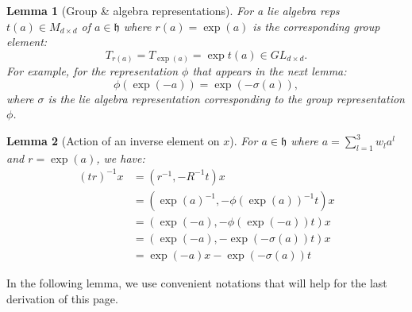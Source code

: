 \documentclass{article}
\newtheorem{lemma}{Lemma}
\begin{document}
\begin{lemma}[Group \& algebra representations]
For a lie algebra reps $t(a)\in M_{d\times d}$ of $a \in\mathfrak{h}$ where $r(a) = \exp(a)$ is the corresponding group element:
\begin{equation}
    T_{r(a)} = T_{\exp(a)} = \exp t(a) \in GL_{d \times d}.
\end{equation}
For example, for the representation $\phi$ that appears in the next lemma:
\begin{equation}
    \phi\left(\exp\left(-a\right)\right) = \exp\left(-\sigma(a) \right),
\end{equation}
where $\sigma$ is the lie algebra representation corresponding to the group representation $\phi$.
\end{lemma}

\begin{lemma}[Action of an inverse element on $x$]
    For $a \in \mathfrak{h}$ where $a = \sum_{l=1}^3 w_l a^l$ and $r = \exp(a)$, we have:
    \begin{align*}
        \left(tr\right)^{-1}x
        &= \left(
            r^{-1}, -R^{-1} t\right)x \\
        &= \left(
            \exp\left(a\right)^{-1}, -\phi\left(\exp\left(a\right)\right)^{-1} t\right)x \\
        &= \left(
            \exp\left(-a\right), -\phi\left(\exp\left(-a\right)\right) t\right)x \\
        &= \left(
            \exp\left(-a\right), -\exp\left(-\sigma(a) \right) t\right)x \\
        &= \exp\left(-a\right)x - \exp\left(-\sigma(a) \right) t
    \end{align*}
\end{lemma}

In the following lemma, we use convenient notations that will help for the last derivation of this page.
\end{document}
